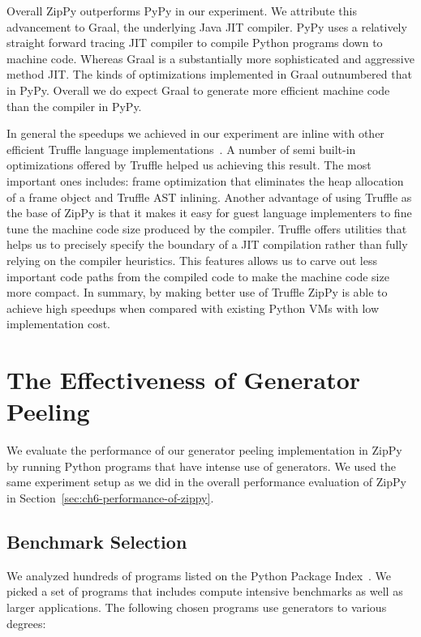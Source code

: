 Overall ZipPy outperforms PyPy in our experiment.
We attribute this advancement to Graal, the underlying Java JIT compiler.
PyPy uses a relatively straight forward tracing JIT compiler to compile Python programs down to machine code.
Whereas Graal is a substantially more sophisticated and aggressive method JIT.
The kinds of optimizations implemented in Graal outnumbered that in PyPy.
Overall we do expect Graal to generate more efficient machine code than the compiler in PyPy.

In general the speedups we achieved in our experiment are inline with other efficient Truffle language implementations~\cite{seaton2014debugging,Grimmer+2014,Grimmer+2014TruffleC}.
A number of semi built-in optimizations offered by Truffle helped us achieving this result.
The most important ones includes: frame optimization that eliminates the heap allocation of a frame object and Truffle AST inlining.
Another advantage of using Truffle as the base of ZipPy is that it makes it easy for guest language implementers to fine tune the machine code size produced by the compiler.
Truffle offers utilities that helps us to precisely specify the boundary of a JIT compilation rather than fully relying on the compiler heuristics.
This features allows us to carve out less important code paths from the compiled code to make the machine code size more compact.
In summary, by making better use of Truffle ZipPy is able to achieve high speedups when compared with existing Python VMs with low implementation cost.

\section{The Effectiveness of Generator Peeling}

We evaluate the performance of our generator peeling implementation in ZipPy by running Python programs that have intense use of generators.
We used the same experiment setup as we did in the overall performance evaluation of ZipPy in Section~\ref{sec:ch6-performance-of-zippy}.

\subsection{Benchmark Selection}

We analyzed hundreds of programs listed on the Python Package Index~\cite{pypi}.
We picked a set of programs that includes compute intensive benchmarks as well as larger applications.
The following chosen programs use generators to various degrees:

